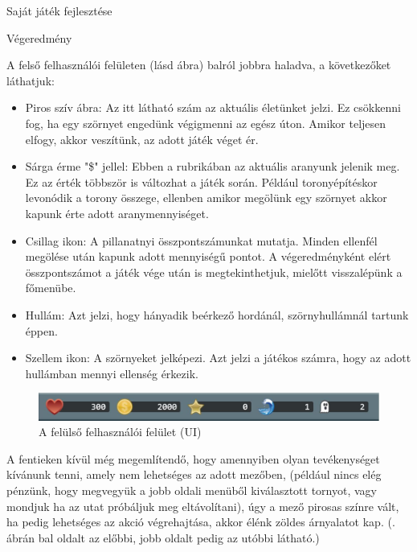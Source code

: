 \begin{MyChapter}{Saját játék fejlesztése}
\begin{MySection}{Végeredmény}
	
		A felső felhasználói felületen (lásd  ábra) balról jobbra haladva, a következőket láthatjuk:
		
		\begin{itemize}
			\item Piros szív ábra: Az itt látható szám az aktuális életünket jelzi. Ez csökkenni fog, ha egy szörnyet engedünk végigmenni az egész úton. Amikor teljesen elfogy, akkor veszítünk, az adott játék véget ér.
			
			\item Sárga érme "\$" jellel: Ebben a rubrikában az aktuális aranyunk jelenik meg. Ez az érték többször is változhat a játék során. Például toronyépítéskor levonódik a torony összege, ellenben amikor megölünk egy szörnyet akkor kapunk érte adott aranymennyiséget.
			
			\item Csillag ikon: A pillanatnyi összpontszámunkat mutatja. Minden ellenfél megölése után kapunk adott mennyiségű pontot. A végeredményként elért összpontszámot a játék vége után is megtekinthetjuk, mielőtt visszalépünk a főmenübe.
			
			\item Hullám: Azt jelzi, hogy hányadik beérkező hordánál, szörnyhullámnál tartunk éppen.
			
			\item Szellem ikon: A szörnyeket jelképezi. Azt jelzi a játékos számra, hogy az adott hullámban mennyi ellenség érkezik.
		\end{itemize}
	
		\begin{figure}[h!]
			\centering
			\includegraphics[scale=0.575]{kepek/jatekHasznalat/felso_ui}
			\caption{A felülső felhasználói felület (UI) }
			\label{fig:jatekHasznalat:felso_ui}
		\end{figure}
	
		A fentieken kívül még megemlítendő, hogy amennyiben olyan tevékenységet kívánunk tenni, amely nem lehetséges az adott mezőben, (például nincs elég pénzünk, hogy megvegyük a jobb oldali menüből kiválasztott tornyot, vagy mondjuk ha az utat próbáljuk meg eltávolítani), úgy a mező pirosas színre vált, ha pedig lehetséges az akció végrehajtása, akkor élénk zöldes árnyalatot kap. (. ábrán bal oldalt az előbbi, jobb oldalt pedig az utóbbi látható.)
		

\end{MySection}
\end{MyChapter}
